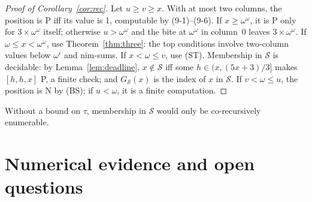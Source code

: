 \documentclass[11pt]{amsart}
\theoremstyle{definition}
\theoremstyle{remark}
\newcommand{\Sc}{\mathcal{S}}
\newcommand{\GS}{G_{\Sc}}
\begin{document}
\begin{proof}[Proof of Corollary~\ref{cor:rec}]
Let $u\ge v\ge x$. With at most two columns, the position is P iff its value is 1, computable
by (9-1)--(9-6). If $x\ge\omega^\omega$, it is P only for $3\times\omega^\omega$ itself;
otherwise $u>\omega^\omega$ and the bite at $\omega^\omega$ in column~0 leaves
$3\times\omega^\omega$. If $\omega\le x<\omega^\omega$, use Theorem~\ref{thm:three}: the top
conditions involve two-column values below $\omega^i$ and nim-sums. If $x<\omega\le v$, use
(ST). Membership in $\Sc$ is decidable: by Lemma~\ref{lem:deadline}, $x\notin\Sc$ iff some
$h\in(x,(5x+3)/3]$ makes $[h,h,x]$ P, a finite check; and $\GS(x)$ is the index of $x$ in $\Sc$. If
$v<\omega\le u$, the position is N by (BS); if $u<\omega$, it is a finite computation.
\end{proof}

Without a bound on $\tau$, membership in $\Sc$ would only be co-recursively enumerable.

\section{Numerical evidence and open questions}\label{sec:numerics}
\end{document}
